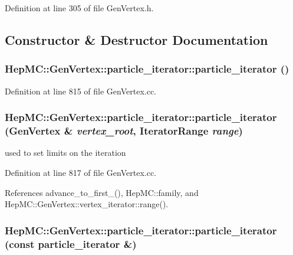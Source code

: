 Definition at line 305 of file Gen\-Vertex.h.

\subsection{Constructor \& Destructor Documentation}
\subsubsection{\setlength{\rightskip}{0pt plus 5cm}Hep\-MC::Gen\-Vertex::particle\_\-iterator::particle\_\-iterator ()}\label{classHepMC_1_1GenVertex_1_1particle__iterator_7c5a60d06fa9b718b70161570ee38b92}




Definition at line 815 of file Gen\-Vertex.cc.
\subsubsection{\setlength{\rightskip}{0pt plus 5cm}Hep\-MC::Gen\-Vertex::particle\_\-iterator::particle\_\-iterator ({\bf Gen\-Vertex} \& {\em vertex\_\-root}, {\bf Iterator\-Range} {\em range})}\label{classHepMC_1_1GenVertex_1_1particle__iterator_f30f9f77a3bb4e72fb59e81341062460}


used to set limits on the iteration 



Definition at line 817 of file Gen\-Vertex.cc.

References advance\_\-to\_\-first\_\-(), Hep\-MC::family, and Hep\-MC::Gen\-Vertex::vertex\_\-iterator::range().
\subsubsection{\setlength{\rightskip}{0pt plus 5cm}Hep\-MC::Gen\-Vertex::particle\_\-iterator::particle\_\-iterator (const {\bf particle\_\-iterator} \&)}\label{classHepMC_1_1GenVertex_1_1particle__iterator_1a4878d06d0f9356d9fd0e4f240baeeb}


